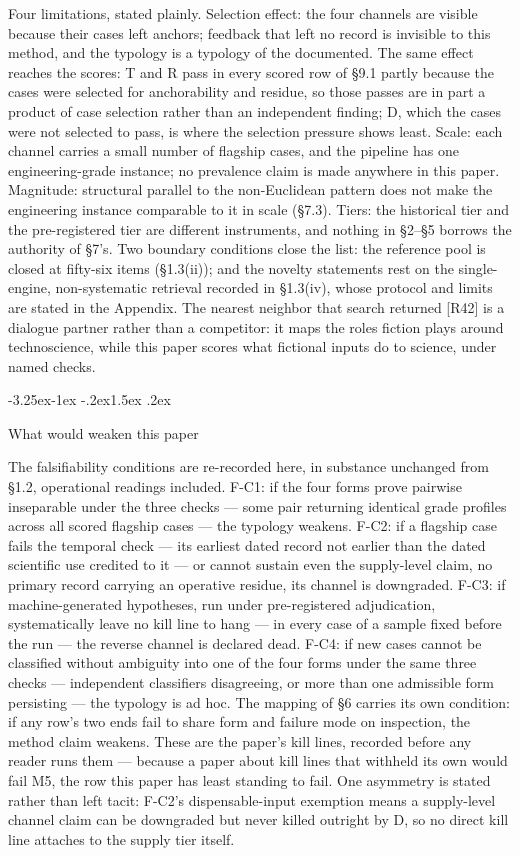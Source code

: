 \documentclass[11pt,a4paper]{article}
\makeatletter
\renewcommand\subsection{\@startsection{subsection}{2}{\z@}%
  {-3.25ex\@plus -1ex \@minus -.2ex}{1.5ex \@plus .2ex}%
  {\normalfont\large\bfseries\raggedright}}
\makeatother
\begin{document}
Four limitations, stated plainly. Selection effect: the four channels are visible because their cases left anchors; feedback that left no record is invisible to this method, and the typology is a typology of the documented. The same effect reaches the scores: T and R pass in every scored row of §9.1 partly because the cases were selected for anchorability and residue, so those passes are in part a product of case selection rather than an independent finding; D, which the cases were not selected to pass, is where the selection pressure shows least. Scale: each channel carries a small number of flagship cases, and the pipeline has one engineering-grade instance; no prevalence claim is made anywhere in this paper. Magnitude: structural parallel to the non-Euclidean pattern does not make the engineering instance comparable to it in scale (§7.3). Tiers: the historical tier and the pre-registered tier are different instruments, and nothing in §2–§5 borrows the authority of §7's. Two boundary conditions close the list: the reference pool is closed at fifty-six items (§1.3(ii)); and the novelty statements rest on the single-engine, non-systematic retrieval recorded in §1.3(iv), whose protocol and limits are stated in the Appendix. The nearest neighbor that search returned [R42] is a dialogue partner rather than a competitor: it maps the roles fiction plays around technoscience, while this paper scores what fictional inputs do to science, under named checks.

\subsection{What would weaken this paper}

The falsifiability conditions are re-recorded here, in substance unchanged from §1.2, operational readings included. F-C1: if the four forms prove pairwise inseparable under the three checks — some pair returning identical grade profiles across all scored flagship cases — the typology weakens. F-C2: if a flagship case fails the temporal check — its earliest dated record not earlier than the dated scientific use credited to it — or cannot sustain even the supply-level claim, no primary record carrying an operative residue, its channel is downgraded. F-C3: if machine-generated hypotheses, run under pre-registered adjudication, systematically leave no kill line to hang — in every case of a sample fixed before the run — the reverse channel is declared dead. F-C4: if new cases cannot be classified without ambiguity into one of the four forms under the same three checks — independent classifiers disagreeing, or more than one admissible form persisting — the typology is ad hoc. The mapping of §6 carries its own condition: if any row's two ends fail to share form and failure mode on inspection, the method claim weakens. These are the paper's kill lines, recorded before any reader runs them — because a paper about kill lines that withheld its own would fail M5, the row this paper has least standing to fail. One asymmetry is stated rather than left tacit: F-C2's dispensable-input exemption means a supply-level channel claim can be downgraded but never killed outright by D, so no direct kill line attaches to the supply tier itself.
\end{document}
